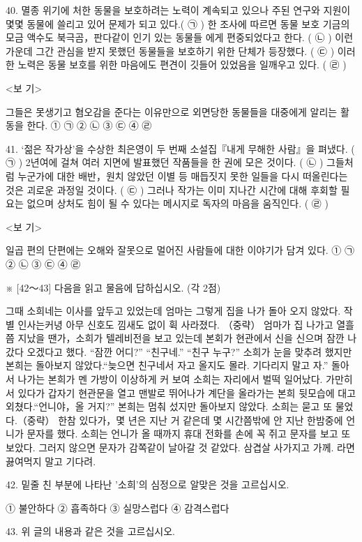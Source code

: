\documentclass[12pt]{article}
\begin{document}
\begin{enumerate}[1.]
40.
  멸종 위기에 처한 동물을 보호하려는 노력이 계속되고 있으나 주된 연구와
지원이 몇몇 동물에 쓸리고 있어 문제가 되고 있다.( ㉠ ) 한 조사에
따르면 동물 보호 기금의 모금 액수도 북극곰，판다같이 인기 있는 동물들
에게 편중되었다고 한다. ( ㉡ ) 이런 가운데 그간 관심을 받지 못했던
동물들을 보호하기 위한 단체가 등장했다. ( ㉢ ) 이러한 노력은 동물
보호를 위한 마음에도 편견이 깃들어 있었음을 일깨우고 있다. ( ㉣ )

<보 기>

그들은 못생기고 혐오감을 준다는 이유만으로 외면당한 동물들을 대중에게
알리는 활동을 한다.
① ㉠	② ㉡	③ ㉢	④ ㉣


41.
  ‘젊은 작가상’을 수상한 최은영이 두 번째 소설집『내게 무해한 사람』을
펴냈다. ( ㉠ ) 2년여에 걸쳐 여러 지면에 발표했던 작품들을 한 권에
모은 것이다. ( ㉡ ) 그들처럼 누군가에 대한 배반，원치 않았던 이별 등
매듭짓지 못한 일들을 다시 떠올린다는 것은 괴로운 과정일 것이다.
( ㉢ ) 그러나 작가는 이미 지나간 시간에 대해 후회할 필요는 없으며
상처도 힘이 될 수 있다는 메시지로 독자의 마음을 움직인다. ( ㉣ )

<보 기>

일곱 편의 단편에는 오해와 잘못으로 멀어진 사람들에 대한 이야기가
담겨 있다.
① ㉠	② ㉡	③ ㉢	④ ㉣




※ [42～43] 다음을 읽고 물음에 답하십시오. (각 2점)

  그때 소희네는 이사를 앞두고 있었는데 엄마는 그렇게 집을 나가 돌아
오지 않았다. 작별 인사는커녕 아무 신호도 낌새도 없이 휙 사라졌다. （중략）
엄마가 집 나가고 열흘쯤 지났을 땐가，소희가 텔레비전을 보고 있는데
본회가 현관에서 신을 신으며 잠깐 나갔다 오겠다고 했다.
  “잠깐 어디?” “친구네.” “친구 누구?” 소희가 눈을 맞추려 했지만 본희는
돌아보지 않았다.“늦으면 친구네서 자고 올지도 몰라. 기다리지 말고 자.”
돌아서 나가는 본희가 멘 가방이 이상하게 커 보여 소희는 자리에서 벌떡
일어났다. 가만히 서 있다가 갑자기 현관문을 열고 맨발로 뛰어나가 계단을
올라가는 본희 뒷모습에 대고 외쳤다.“언니야，올 거지?” 본희는 멈춰
섰지만 돌아보지 않았다. 소희는 묻고 또 물었다.（중략）
   한참 있다가，몇 년은 지난 거 같은데 몇 시간쯤밖에 안 지난 한밤중에
언니가 문자를 했다. 소희는 언니가 올 때까지 휴대 전화를 손에 꼭 쥐고
문자를 보고 또 보았다. 그러지 않으면 문자가 감쪽같이 날아갈 것 같았다.
   삼겹살 사가지고 가께. 라면 끓여먹지 말고 기다려.


42. 밑줄 친 부분에 나타난 '소희'의 심정으로 알맞은 것을 고르십시오.

① 불안하다	② 흡족하다
③ 실망스럽다	④ 감격스럽다


43. 위 글의 내용과 같은 것을 고르십시오.


\end{enumerate}
\end{document}
